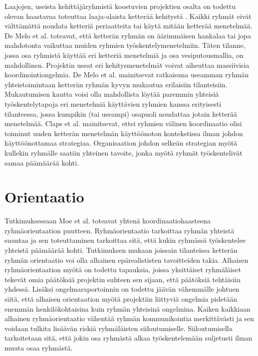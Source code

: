 Laajojen, useista kehittäjäryhmistä koostuvien projektien osalta on todettu olevan haastavaa toteuttaa laaja-alaista ketterää kehitystä \cite{DEOMELO2013412}. Kaikki ryhmät eivät välttämättä noudata ketteriä periaatteita tai käytä mitään ketterää menetelmää. De Melo et al. \cite{DEOMELO2013412} toteavat, että ketterän ryhmän on äärimmäisen hankalaa tai jopa mahdotonta vaikuttaa muiden ryhmien työskentelymenetelmiin. Täten tilanne, jossa osa ryhmistä käyttää eri ketteriä menetelmiä ja osa vesiputousmallia, on mahdollinen. Projektin useat eri kehitysmenetelmät voivat aiheuttaa massiivisia koordinointiongelmia. De Melo et al. mainitsevat ratkaisuna useamman ryhmän yhteistoimintaan ketterän ryhmän kyvyn mukautua erilaisiin tilanteisiin. Mukautumisen kautta voisi olla mahdollista löytää paremmin yhteisiä työskentelytapoja eri menetelmiä käyttävien ryhmien kanssa erityisesti tilanteessa, jossa kumpikin (tai useampi) osapuoli noudattaa jotain ketterää menetelmää. Claps et al. \cite{CLAPS201521} mainitsevat, ettei ryhmien välinen koordinaatio olisi toiminut uuden ketterän menetelmän käyttöönoton kontekstissa ilman johdon käyttöönottamaa strategiaa. Organisaation johdon selkeän strategian myötä kullekin ryhmälle saatiin yhteinen tavoite, jonka myötä ryhmät työskentelivät samaa päämäärää kohti.

\section{Orientaatio}

Tutkimuksessaan Moe et al. \cite{MOE2012853} toteavat yhtenä koordinaatiohaasteena ryhmäorientaation puutteen. Ryhmäorientaatio tarkoittaa ryhmän yhteistä suuntaa ja sen toteuttaminen tarkoittaa sitä, että kukin ryhmässä työskentelee yhteistä päämäärää kohti. Tutkimuksen mukaan joissain tilanteissa ketterän ryhmän orientaatio voi olla alhainen epärealististen tavoitteiden takia. Alhaisen ryhmäorientaation myötä on todettu tapauksia, joissa yksittäiset ryhmäläiset tekevät omia päätöksiä projektin suhteen sen sijaan, että päätöksiä tehtäisiin yhdessä. Lisäksi ongelmaraportoinnin on todettu jäävän vähemmälle johtuen siitä, että alhaisen orientaation myötä projektiin liittyviä ongelmia pidetään enemmän henkilökohtaisina kuin ryhmän yhteisinä ongelmina. Kaiken kaikkiaan alhainen ryhmäorientaatio vähentää ryhmän kommunikointia merkittävästi ja sen voidaan tulkita lisäävän riskiä ryhmäläisten siiloutumiselle. Siiloutumisella tarkoitetaan sitä, että jokin osa ryhmästä alkaa työskentelemään suljetusti ilman muuta osaa ryhmästä.

